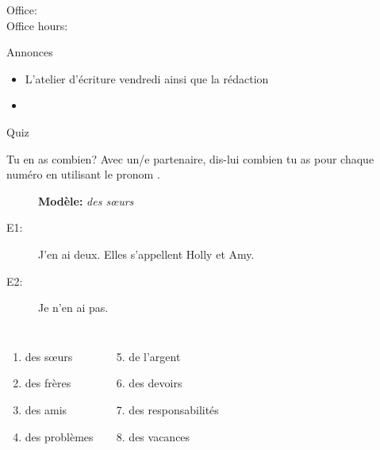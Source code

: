 \documentclass{beamer}
\subtitle[Fruits et légumes, quantités et \lexi{en})]{Les fruits et légumes, les quantités et le pronom \lexi{en}}
\begin{document}
  \begin{frame}
    \titlepage
    \tiny{Office: \\
          Office hours: }
  \end{frame}

  \begin{frame}{Annonces}
    \begin{itemize}
      \item L'atelier d'écriture vendredi ainsi que la rédaction
      \item[] 
    \end{itemize}
  \end{frame}

  \begin{frame}{}
    \begin{center}
      \Large Quiz
    \end{center}
  \end{frame}

  \begin{frame}{Tu en as combien?}
    Avec un/e partenaire, dis-lui combien tu as pour chaque numéro en utilisant le pronom . \\
    \begin{description}
      \item[] \textbf{Modèle:} \emph{des sœurs}
      \item[E1:] J'en ai deux. Elles s'appellent Holly et Amy.
      \item[E2:] Je n'en ai pas.
    \end{description}
    \begin{columns}
        \begin{enumerate}
          \item des sœurs
          \item des frères
          \item des amis
          \item des problèmes
        \end{enumerate}
        \begin{enumerate}
          \setcounter{enumi}{4}
          \item de l'argent
          \item des devoirs
          \item des responsabilités
          \item des vacances
        \end{enumerate}
    \end{columns}
  \end{frame}
\end{document}
